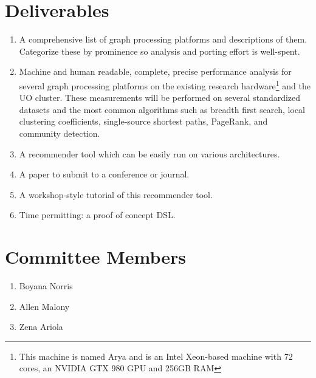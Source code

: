 \documentclass[11pt]{article}
\begin{document}
\section{Deliverables}
	\begin{enumerate}
		\item A comprehensive list of graph processing platforms and descriptions of them. Categorize these by prominence so analysis and porting effort is well-spent.
		\item Machine and human readable, complete, precise performance analysis for several graph processing platforms on the existing research hardware\footnote{This machine is named Arya and is an Intel Xeon-based machine with 72 cores, an NVIDIA GTX 980 GPU and 256GB RAM} and the UO cluster. These measurements will be performed on several standardized datasets and the most common algorithms such as breadth first search, local clustering coefficients, single-source shortest paths, PageRank, and community detection.
		\item A recommender tool which can be easily run on various architectures.
		\item A paper to submit to a conference or journal.
		\item A workshop-style tutorial of this recommender tool.
		\item Time permitting: a proof of concept DSL.
	\end{enumerate}

\section{Committee Members}
\begin{enumerate}
	\item Boyana Norris
	\item Allen Malony
	\item Zena Ariola
\end{enumerate}


\end{document}
